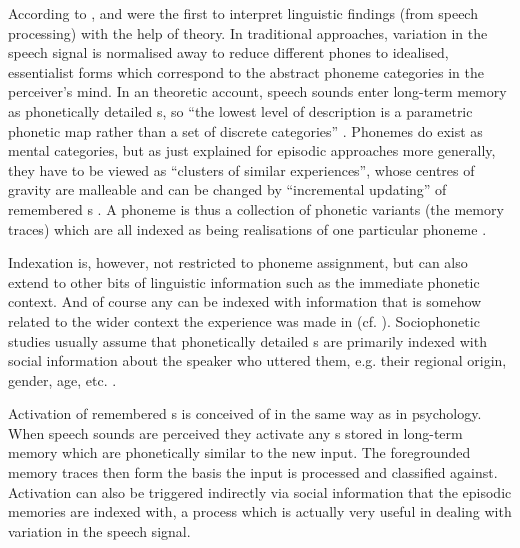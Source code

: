 According to \textcite[cf.][517]{pierrehumbert2006}, \textcite{goldinger1996} and \textcite{johnson1997} were the first to interpret linguistic findings (from speech processing) with the help of  theory.
In traditional approaches, variation in the speech signal is normalised away to reduce different phones to idealised, essentialist forms which correspond to the abstract phoneme categories in the perceiver's mind.
In an  theoretic account, speech sounds enter long-term memory as phonetically detailed s, so ``the lowest level of description is a parametric phonetic map rather than a set of discrete categories'' \parencite[519]{pierrehumbert2006}.
Phonemes do exist as mental categories, but as just explained for episodic approaches more generally, they have to be viewed as ``clusters of similar experiences'', whose centres of gravity are malleable and can be changed by ``incremental updating'' of remembered s \parencite[cf.][519]{pierrehumbert2006}.
A phoneme is thus a collection of phonetic variants (the memory traces) which are all indexed as being realisations of one particular phoneme \parencite[cf.][113]{pierrehumbert2002}.

Indexation is, however, not restricted to phoneme assignment, but can also extend to other bits of linguistic information such as the immediate phonetic context.
And of course any  can be indexed with information that is somehow related to the wider context the experience was made in (cf. ).
Sociophonetic studies usually assume that phonetically detailed s are primarily indexed with social information about the speaker who uttered them, e.g. their regional origin, gender, age, etc. \parencite[cf.][370]{hayetal2006a}.

Activation of remembered s is conceived of in the same way as in psychology.
When speech sounds are perceived they activate any s stored in long-term memory which are phonetically similar to the new input.
The foregrounded memory traces then form the basis the input is processed and classified against.
Activation can also be triggered indirectly via social information that the episodic memories are indexed with, a process which is actually very useful in dealing with variation in the speech signal.

